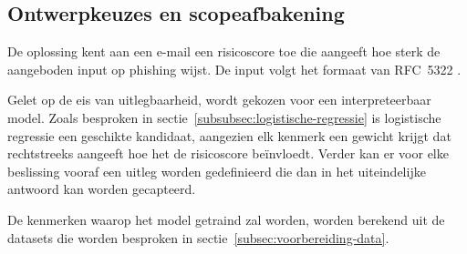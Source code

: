 \subsection{Ontwerpkeuzes en scopeafbakening}
\label{subsec:afbakening-scope}
De oplossing kent aan een e-mail een risicoscore toe die aangeeft hoe sterk de aangeboden input op phishing wijst. De input volgt het formaat van RFC~5322 \autocite{Resnick2008}.

Gelet op de eis van uitlegbaarheid, wordt gekozen voor een interpreteerbaar model. Zoals besproken in sectie~\ref{subsubsec:logistische-regressie} is logistische regressie een geschikte kandidaat, aangezien elk kenmerk een gewicht krijgt dat rechtstreeks aangeeft hoe het de risicoscore beïnvloedt. Verder kan er voor elke beslissing vooraf een uitleg worden gedefinieerd die dan in het uiteindelijke antwoord kan worden gecapteerd.

De kenmerken waarop het model getraind zal worden, worden berekend uit de datasets die worden besproken in sectie~\ref{subsec:voorbereiding-data}. 

